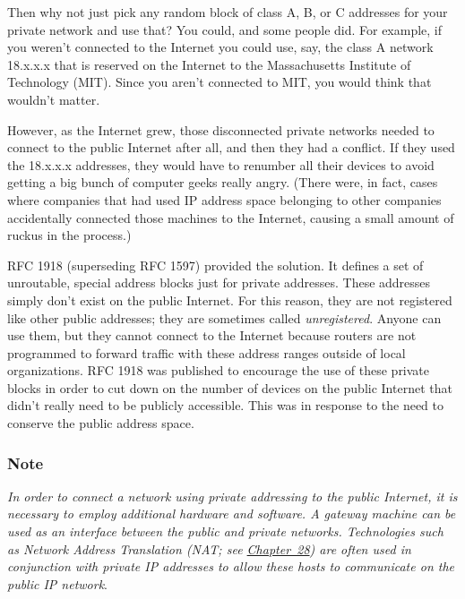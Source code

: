 Then why not just pick any random block of class A, B, or C addresses
for your private network and use that? You could, and some people did.
For example, if you weren't connected to the Internet you could use,
say, the class A network 18.x.x.x that is reserved on the Internet to
the
\protect\hypertarget{ch17s05.htmlux5cux23idx-CHP-17-0701}{}{}Massachusetts
Institute of Technology (MIT). Since you aren't connected to MIT, you
would think that wouldn't matter.

However, as the Internet grew, those disconnected private networks
needed to connect to the public Internet after all, and then they had a
conflict. If they used the 18.x.x.x addresses, they would have to
renumber all their devices to avoid getting a big bunch of computer
geeks really angry. (There were, in fact, cases where companies that had
used IP address space belonging to other companies accidentally
connected those machines to the Internet, causing a small amount of
ruckus in the process.)

RFC 1918 (superseding RFC 1597) provided the solution. It defines a set
of unroutable, special address blocks just for private addresses. These
addresses simply don't exist on the public Internet. For this reason,
they are not registered like other public addresses; they are sometimes
called {\emph{unregistered}}. Anyone can use them, but they cannot
connect to the Internet because routers are not programmed to forward
traffic with these address ranges outside of local organizations. RFC
1918 was published to encourage the use of these private blocks in order
to cut down on the number of devices on the public Internet that didn't
really need to be publicly accessible. This was in response to the need
to conserve the public address space.

\subsubsection[Note]{\texorpdfstring{\protect\hypertarget{ch17s05.htmlux5cux23note-67}{}{}Note}{Note}}

{\emph{In order to connect a network using private addressing to the
public Internet, it is necessary to employ additional hardware and
software. A gateway machine can be used as an interface between the
public and private networks. Technologies such as Network Address
Translation (NAT; see \protect\hyperlink{ch28.html}{Chapter~28}) are
often used in conjunction with private IP addresses to allow these hosts
to communicate on the public IP
network}}.\protect\hypertarget{ch17s05.htmlux5cux23idx-CHP-17-0702}{}{}


